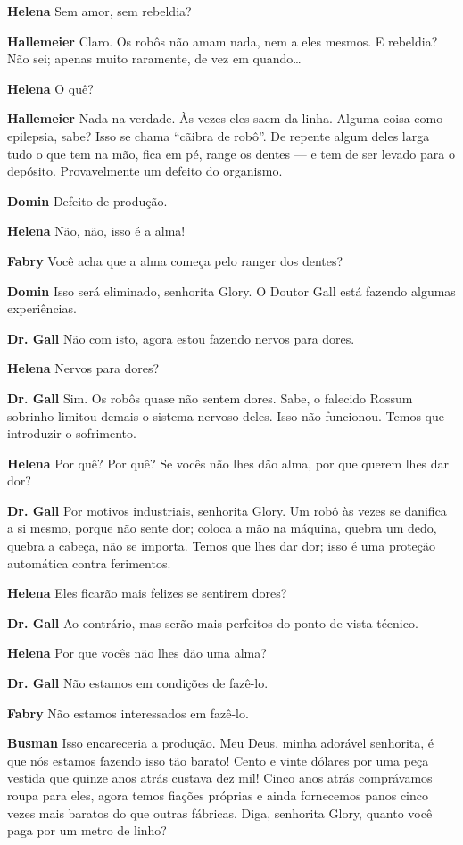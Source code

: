 \textbf{Helena} Sem amor, sem rebeldia?

\textbf{Hallemeier} Claro. Os robôs não amam nada, nem a eles mesmos. E rebeldia? Não
sei; apenas muito raramente, de vez em quando\ldots{}

\textbf{Helena} O quê?

\textbf{Hallemeier} Nada na verdade. Às vezes eles saem da linha. Alguma coisa como
epilepsia, sabe? Isso se chama ``cãibra de robô''. De repente algum deles larga
tudo o que tem na mão, fica em pé, range os dentes --- e tem de ser levado para o depósito.
Provavelmente um defeito do organismo.

\textbf{Domin} Defeito de produção.

\textbf{Helena} Não, não, isso é a alma!

\textbf{Fabry} Você acha que a alma começa pelo ranger dos dentes?

\textbf{Domin} Isso será eliminado, senhorita Glory. O Doutor Gall está fazendo algumas
experiências.

\textbf{Dr. Gall} Não com isto, agora estou fazendo nervos para dores.

\textbf{Helena} Nervos para dores?

\textbf{Dr. Gall} Sim. Os robôs quase não sentem dores. Sabe, o falecido Rossum sobrinho
limitou demais o sistema nervoso deles. Isso não funcionou. Temos que introduzir
o sofrimento.

\textbf{Helena} Por quê? Por quê? Se vocês não lhes dão alma, por que querem lhes dar
dor?

\textbf{Dr. Gall} Por motivos industriais, senhorita Glory. Um robô às vezes se danifica
a si mesmo, porque não sente dor; coloca a mão na máquina, quebra um dedo,
quebra a cabeça, não se importa. Temos que lhes dar dor; isso é uma proteção
automática contra ferimentos.

\textbf{Helena} Eles ficarão mais felizes se sentirem dores?

\textbf{Dr. Gall} Ao contrário, mas serão mais perfeitos do ponto de vista técnico.

\textbf{Helena} Por que vocês não lhes dão uma alma?

\textbf{Dr. Gall} Não estamos em condições de fazê-lo.

\textbf{Fabry} Não estamos interessados em fazê-lo.

\textbf{Busman} Isso encareceria a produção. Meu Deus, minha adorável senhorita, é que nós estamos
fazendo isso tão barato! Cento e vinte dólares por uma peça vestida que quinze
anos atrás custava dez mil! Cinco anos atrás comprávamos roupa para eles, agora
temos fiações próprias e ainda fornecemos panos cinco vezes mais baratos do que
outras fábricas. Diga, senhorita Glory, quanto você paga por um metro de linho?

